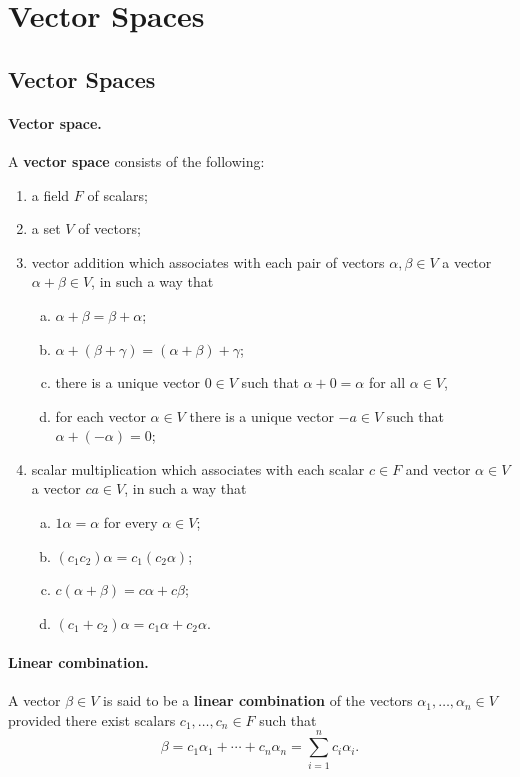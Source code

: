 \documentclass{article}
\begin{document}
\section{Vector Spaces}

\subsection{Vector Spaces}

\paragraph{Vector space.} A \textbf{vector space} consists of the following:
\begin{enumerate}
  \item a field $F$ of scalars;
  \item a set $V$ of vectors;
  \item vector addition which associates with each pair of vectors $\alpha,
    \beta \in V$ a vector $\alpha + \beta \in V$, in such a way that
    \begin{enumerate}[(a)]
      \item $\alpha + \beta = \beta + \alpha$;
      \item $\alpha + (\beta + \gamma) = (\alpha + \beta) + \gamma$;
      \item there is a unique vector $0 \in V$ such that $\alpha + 0 = \alpha$
        for all $\alpha \in V$,
      \item for each vector $\alpha \in V$ there is a unique vector $-a \in V$
        such that $\alpha + (-\alpha) = 0$;
    \end{enumerate}
  \item scalar multiplication which associates with each scalar $c \in F$ and
    vector $\alpha \in V$ a vector $ca \in V$, in such a way that
    \begin{enumerate}[(a)]
      \item $1\alpha = \alpha$ for every $\alpha \in V$;
      \item $(c_1c_2)\alpha = c_1(c_2\alpha)$;
      \item $c(\alpha + \beta) = c\alpha + c\beta$;
      \item $(c_1 + c_2)\alpha = c_1\alpha + c_2\alpha$.
    \end{enumerate}
\end{enumerate}

\paragraph{Linear combination.} A vector $\beta \in V$ is said to be a
\textbf{linear combination} of the vectors $\alpha_1, \ldots, \alpha_n \in V$
provided there exist scalars $c_1, \ldots, c_n \in F$ such that \[
  \beta = c_1\alpha_1 + \cdots + c_n\alpha_n = \sum_{i=1}^n c_i\alpha_i.
\]
\end{document}

